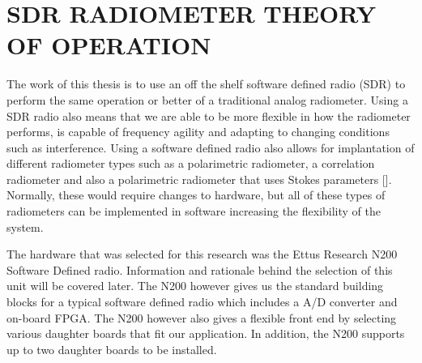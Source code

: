 

\chapter{SDR RADIOMETER THEORY OF OPERATION}

The work of this thesis is to use an off the shelf software defined radio (SDR) to perform the same operation or better of a traditional analog radiometer.  Using a SDR radio also means that we are able to be more flexible in how the radiometer performs, is capable of frequency agility and adapting to changing conditions such as interference.  Using a software defined radio also allows for implantation of different radiometer types such as a polarimetric radiometer, a correlation radiometer and also a polarimetric radiometer that uses Stokes parameters [\cite{Wang}].  Normally, these would require changes to hardware, but all of these types of radiometers can be implemented in software increasing the flexibility of the system.  

The hardware that was selected for this research was the Ettus Research N200 Software Defined radio.  Information and rationale behind the selection of this unit will be covered later.  The N200 however gives us the standard building blocks for a typical software defined radio which includes a A/D converter and on-board FPGA.  The N200 however also gives a flexible front end by selecting various daughter boards that fit our application.  In addition, the N200 supports up to two daughter boards to be installed.  

